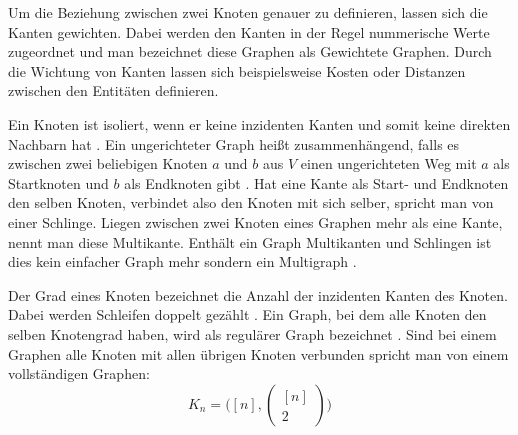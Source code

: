 Um die Beziehung zwischen zwei Knoten genauer zu definieren, lassen sich die Kanten gewichten.
Dabei werden den Kanten in der Regel nummerische Werte zugeordnet und man bezeichnet diese Graphen als Gewichtete Graphen.
Durch die Wichtung von Kanten lassen sich beispielsweise Kosten oder Distanzen zwischen den Entitäten definieren.

Ein Knoten ist isoliert, wenn er keine inzidenten Kanten und somit keine direkten Nachbarn hat \cite{knauer2015diskrete}.
Ein ungerichteter Graph heißt zusammenhängend, falls es zwischen zwei beliebigen Knoten $a$ und $b$ aus $V$ einen ungerichteten Weg mit $a$ als Startknoten und $b$ als Endknoten gibt \cite[36-38]{krumke2012graphentheoretische}.
Hat eine Kante als Start- und Endknoten den selben Knoten, verbindet also den Knoten mit sich selber, spricht man von einer Schlinge.
Liegen zwischen zwei Knoten eines Graphen mehr als eine Kante, nennt man diese Multikante.
Enthält ein Graph Multikanten und Schlingen ist dies kein einfacher Graph mehr sondern ein Multigraph \cite{felsner01}.

Der Grad eines Knoten bezeichnet die Anzahl der inzidenten Kanten des Knoten.
Dabei werden Schleifen doppelt gezählt \cite{rahm2017}.
Ein Graph, bei dem alle Knoten den selben Knotengrad haben, wird als regulärer Graph bezeichnet \cite{felsner2012geometric}.
Sind bei einem Graphen alle Knoten mit allen übrigen Knoten verbunden spricht man von einem vollständigen Graphen:
\[K_{n}=\big([n],\begin{pmatrix}
					 [n] \\ 2
\end{pmatrix}\big)\]

